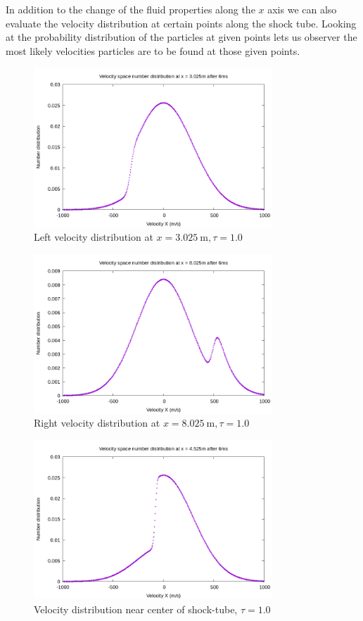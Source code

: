 \documentclass[paper=a4, fontsize=12pt]{scrartcl}
\begin{document}
\noindent
In addition to the change of the fluid properties along the $x$ axis we can also
evaluate the velocity distribution at certain points along the shock tube.
Looking at the probability distribution of the particles at given points lets us
observer the most likely velocities particles are to be found at those given points.

\begin{figure}[H]
        \centering
        \includegraphics[width=0.8\textwidth]{left_f-t}
        \caption{Left velocity distribution at $x = \SI{3.025}{\meter}, \tau = 1.0$ }
        \label{fig:left_f-t}
\end{figure}
\begin{figure}[H]
        \centering
        \includegraphics[width=0.8\textwidth]{right_f-t}
        \caption{Right velocity distribution at $x = \SI{8.025}{\meter}, \tau = 1.0$ }
        \label{fig:right_f-t}
\end{figure}
\begin{figure}[H]
        \centering
        \includegraphics[width=0.8\textwidth]{center_shock-t}
        \caption{Velocity distribution near center of shock-tube, $\tau = 1.0$}
        \label{fig:center_shock-t}
\end{figure}
\end{document}
